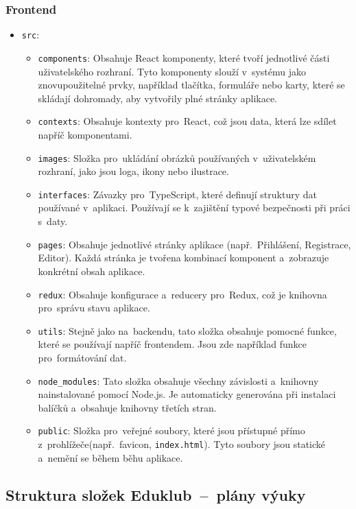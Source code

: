 \documentclass[male,czech,api_bc]{kitheses}
\begin{document}
\subsubsection{Frontend}
\begin{itemize}
	\item \texttt{src}:
	\begin{itemize}
		\item \texttt{components}: Obsahuje React komponenty, které tvoří jednotlivé části uživatelského rozhraní. Tyto komponenty slouží v~systému jako znovupoužitelné prvky, například tlačítka, formuláře nebo karty, které se skládají dohromady, aby vytvořily plné stránky aplikace.
		\item \texttt{contexts}: Obsahuje kontexty pro~React, což jsou data, která lze sdílet napříč komponentami.
		\item \texttt{images}: Složka pro~ukládání obrázků používaných v~uživatelském rozhraní, jako jsou loga, ikony nebo ilustrace.
		\item \texttt{interfaces}: Závazky pro~TypeScript, které definují struktury dat používané v~aplikaci. Používají se k~zajištění typové bezpečnosti při práci s~daty.
		\item \texttt{pages}: Obsahuje jednotlivé stránky aplikace (např.~Přihlášení, Registrace, Editor). Každá stránka je tvořena kombinací komponent a~zobrazuje konkrétní obsah aplikace.
		\item \texttt{redux}: Obsahuje konfigurace a~reducery pro~Redux, což je knihovna pro~správu stavu aplikace.
		\item \texttt{utils}: Stejně jako na~backendu, tato složka obsahuje pomocné funkce, které se používají napříč frontendem. Jsou zde například funkce pro~formátování dat.
		\item \texttt{node\_modules}: Tato složka obsahuje všechny závislosti a~knihovny nainstalované pomocí Node.js. Je automaticky generována při instalaci balíčků a~obsahuje knihovny třetích stran.
		\item \texttt{public}: Složka pro~veřejné soubory, které jsou přístupné přímo z~prohlížeče\break(např.~favicon, \texttt{index.html}). Tyto soubory jsou statické a~nemění se během běhu aplikace.
	\end{itemize}
\end{itemize}

\subsection{Struktura složek Eduklub~--~plány výuky}
\end{document}
